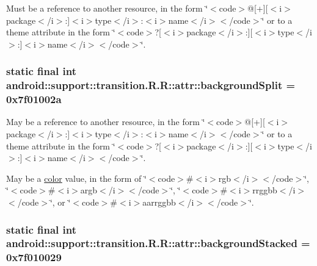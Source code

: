 Must be a reference to another resource, in the form \char`\"{}$<$code$>$@\mbox{[}+\mbox{]}\mbox{[}$<$i$>$package$<$/i$>$:\mbox{]}$<$i$>$type$<$/i$>$:$<$i$>$name$<$/i$>$$<$/code$>$\char`\"{} or to a theme attribute in the form \char`\"{}$<$code$>$?\mbox{[}$<$i$>$package$<$/i$>$:\mbox{]}\mbox{[}$<$i$>$type$<$/i$>$:\mbox{]}$<$i$>$name$<$/i$>$$<$/code$>$\char`\"{}. \hypertarget{classandroid_1_1support_1_1transition_1_1_r_1_1attr_35bcf2c9f9ae685b14144fe953ff598f}{
\subsubsection[{backgroundSplit}]{\setlength{\rightskip}{0pt plus 5cm}static final int android::support::transition.R.R::attr::backgroundSplit = 0x7f01002a}}
\label{classandroid_1_1support_1_1transition_1_1_r_1_1attr_35bcf2c9f9ae685b14144fe953ff598f}


May be a reference to another resource, in the form \char`\"{}$<$code$>$@\mbox{[}+\mbox{]}\mbox{[}$<$i$>$package$<$/i$>$:\mbox{]}$<$i$>$type$<$/i$>$:$<$i$>$name$<$/i$>$$<$/code$>$\char`\"{} or to a theme attribute in the form \char`\"{}$<$code$>$?\mbox{[}$<$i$>$package$<$/i$>$:\mbox{]}\mbox{[}$<$i$>$type$<$/i$>$:\mbox{]}$<$i$>$name$<$/i$>$$<$/code$>$\char`\"{}. 

May be a \hyperlink{classandroid_1_1support_1_1transition_1_1_r_1_1color}{color} value, in the form of \char`\"{}$<$code$>$\#$<$i$>$rgb$<$/i$>$$<$/code$>$\char`\"{}, \char`\"{}$<$code$>$\#$<$i$>$argb$<$/i$>$$<$/code$>$\char`\"{}, \char`\"{}$<$code$>$\#$<$i$>$rrggbb$<$/i$>$$<$/code$>$\char`\"{}, or \char`\"{}$<$code$>$\#$<$i$>$aarrggbb$<$/i$>$$<$/code$>$\char`\"{}. \hypertarget{classandroid_1_1support_1_1transition_1_1_r_1_1attr_0230ee2a9e2b4a56250fc3512c082d81}{
\subsubsection[{backgroundStacked}]{\setlength{\rightskip}{0pt plus 5cm}static final int android::support::transition.R.R::attr::backgroundStacked = 0x7f010029}}
\label{classandroid_1_1support_1_1transition_1_1_r_1_1attr_0230ee2a9e2b4a56250fc3512c082d81}


